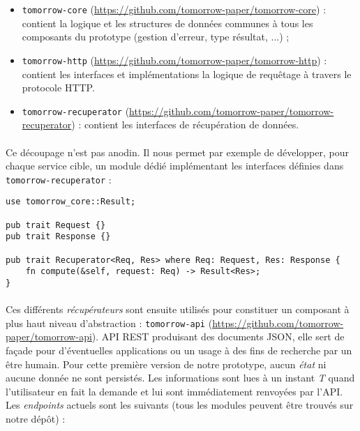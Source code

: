 \begin{itemize}
    \item \lstinline{tomorrow-core} (\url{https://github.com/tomorrow-paper/tomorrow-core}) : contient la logique et les
    structures de données communes à tous les composants du prototype (gestion d'erreur, type résultat, ...) ;
    \item \lstinline{tomorrow-http} (\url{https://github.com/tomorrow-paper/tomorrow-http}) : contient les interfaces et
    implémentations la logique de requêtage à travers le protocole HTTP.
    \item \lstinline{tomorrow-recuperator} (\url{https://github.com/tomorrow-paper/tomorrow-recuperator}) : contient les interfaces
    de récupération de données.
\end{itemize}

\paragraph{} Ce découpage n'est pas anodin. Il nous permet par exemple de développer, pour chaque service cible, un module
dédié implémentant les interfaces définies dans \lstinline{tomorrow-recuperator}  :

\begin{lstlisting}
use tomorrow_core::Result;

pub trait Request {}
pub trait Response {}

pub trait Recuperator<Req, Res> where Req: Request, Res: Response {
    fn compute(&self, request: Req) -> Result<Res>;
}\end{lstlisting}

\paragraph{} Ces différents \emph{récupérateurs} sont ensuite utilisés pour constituer un composant à plus haut niveau
d'abstraction : \lstinline{tomorrow-api} (\url{https://github.com/tomorrow-paper/tomorrow-api}). API REST produisant des
documents JSON, elle sert de façade pour d'éventuelles applications ou un usage à des fins de recherche par un être humain. 
Pour cette première version de notre prototype, aucun \emph{état} ni aucune donnée ne sont persistés. Les informations 
sont lues à un instant \emph{T} quand l'utilisateur en fait la demande et lui sont immédiatement renvoyées par l'API.
Les \emph{endpoints} actuels sont les suivants (tous les modules peuvent être trouvés sur notre dépôt) :

